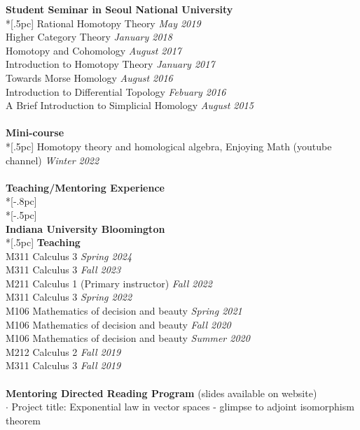 \documentclass{article}
\begin{document}
{\bf \large Student Seminar in Seoul National University}\\*[.5pc] 
{Rational Homotopy Theory } \hfill {\it May 2019\/} \\
{Higher Category Theory} \hfill {\it January 2018\/} \\
{Homotopy and Cohomology } \hfill {\it August 2017\/} \\
{Introduction to Homotopy Theory } \hfill {\it January 2017\/} \\
{Towards Morse Homology } \hfill {\it August 2016\/} \\
{Introduction to Differential Topology } \hfill {\it Febuary 2016\/} \\
{A Brief Introduction to Simplicial Homology } \hfill {\it August 2015\/} \\
\\
{\bf \large Mini-course} \\*[.5pc]
{Homotopy theory and homological algebra, Enjoying Math (youtube channel)} \hfill {\it Winter 2022\/} \\
\\
{\Large \bf Teaching/Mentoring Experience} \\*[-.8pc]
\underline{\hspace{6.5in}} \\*[-.5pc]
\\
{\bf \large Indiana University Bloomington}  \\*[.5pc]
{\bf Teaching} \\
M311 Calculus 3  \hfill {\it Spring 2024 \/}\\
M311 Calculus 3  \hfill {\it Fall 2023 \/}\\
M211 Calculus 1 (Primary instructor)   \hfill {\it Fall 2022 \/}\\
M311 Calculus 3  \hfill {\it Spring 2022 \/}\\
M106 Mathematics of decision and beauty \hfill {\it Spring 2021}\\
M106 Mathematics of decision and beauty \hfill {\it Fall 2020}\\
M106 Mathematics of decision and beauty \hfill {\it Summer 2020}\\
M212 Calculus 2  \hfill {\it Fall 2019 \/}\\
M311 Calculus 3  \hfill {\it Fall 2019 \/}\\ \\
{\bf Mentoring Directed Reading Program} (slides available on website) \\
$\cdot$ Project title: Exponential law in vector spaces - glimpse to adjoint isomorphism theorem
\end{document}
